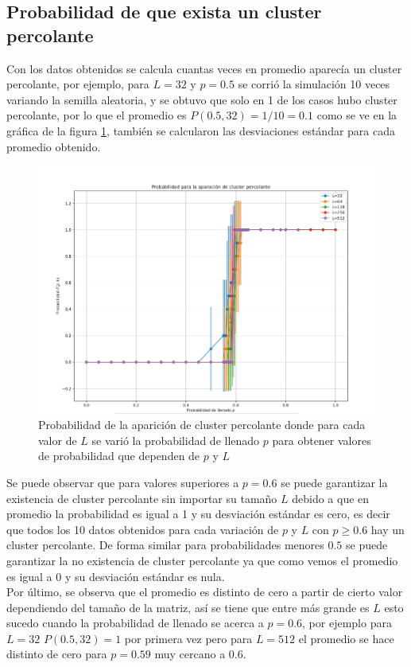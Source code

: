 \documentclass[11pt,twocolumn]{article}
\begin{document}
\subsection{\textbf{Probabilidad de que exista un cluster percolante}}
Con los datos obtenidos se calcula cuantas veces en promedio aparecía un cluster percolante, por ejemplo, para $L=32$ y $p=0.5$ se corrió la simulación 10 veces variando la semilla aleatoria, y se obtuvo que solo en 1 de los casos hubo cluster percolante, por lo que el promedio es $P(0.5,32)=1/10=0.1$ como se ve en la gráfica de la figura \ref{Promedio}, también se calcularon las desviaciones estándar para cada promedio obtenido.
\begin{figure}[H]
    \centering
    \includegraphics[scale=0.35]{Imagenes/Probabilidad.png}
    \caption{Probabilidad de la aparición de cluster percolante donde para cada valor de $L$ se varió la probabilidad de llenado $p$ para obtener valores de probabilidad que dependen de $p$ y $L$}
    \label{Promedio}
\end{figure}

Se puede observar que para valores superiores a $p=0.6$ se puede garantizar la existencia de cluster percolante sin importar su tamaño $L$ debido a que en promedio la probabilidad es igual a 1 y su desviación estándar es cero, es decir que todos los 10 datos obtenidos para cada variación de $p$ y $L$ con $p\geq0.6$ hay un cluster percolante. De forma similar para probabilidades menores $0.5$ se puede garantizar la no existencia de cluster percolante ya que como vemos el promedio es igual a 0 y su desviación estándar es nula.\\
Por último, se observa que el promedio es distinto de cero a partir de cierto valor dependiendo del tamaño de la matriz, así se tiene que entre más grande es $L$ esto sucedo cuando la probabilidad de llenado se acerca a $p=0.6$, por ejemplo para $L=32$ $P(0.5,32)=1$ por primera vez pero para $L=512$ el promedio se hace distinto de cero para $p=0.59$ muy cercano a $0.6$.
\end{document}
